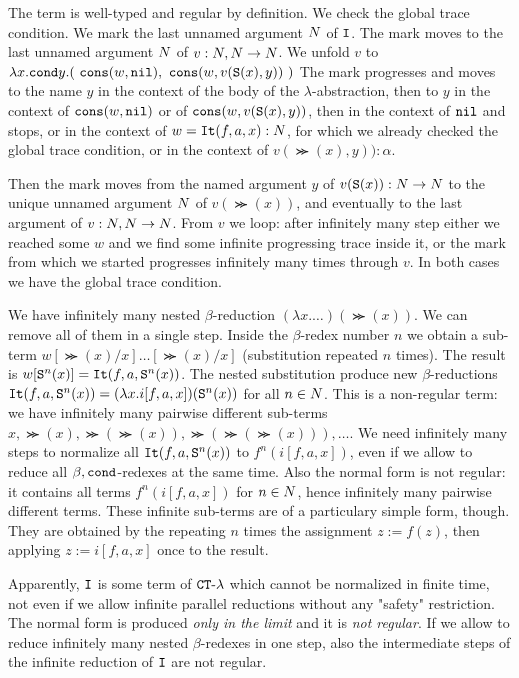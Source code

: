 \documentclass{article}
\begin{document}
The term is well-typed and regular by definition. We check the global trace condition.
We mark the last unnamed argument ${N}$ of ${\tt I}$.
The mark moves to the last unnamed argument ${N}$ of  
$v:{N},{N} \rightarrow {N}$. 
We unfold $v$ to $\lambda x.{\tt cond} y. 
(\ {\tt cons}(w, {\tt nil}),  \  {\tt cons}(w, v({\tt S} (x),y)) \ )$
The mark progresses and moves to the name $y$ in the context of the body of the $\lambda$-abstraction,
then to $y$ in the context of ${\tt cons}(w, {\tt nil})$ or of ${\tt cons}(w, v({\tt S} (x),y))$,
then in the context of ${\tt nil}$ and stops, or in the context of $w={\tt It}(f,a,x):{N}$, 
for which we already checked the global trace condition, or in the context of $v(\Succ (x),y)):\alpha$. 

Then the mark moves from the named argument $y$ of $v({\tt S} (x)):{N} \rightarrow {N}$ to the unique 
unnamed argument ${N}$ of $v(\Succ (x))$, and eventually to the last argument of $v:{N},{N}\rightarrow {N}$. 
From $v$ we loop: after infinitely many step either we reached some $w$ and we find 
some infinite progressing trace inside it, or the
mark from which we started progresses infinitely many times through $v$. In both cases we have the
global trace condition.

We have infinitely many nested $\beta$-reduction $(\lambda x. \ldots)(\Succ (x))$.
We can remove all of them in a single step. Inside the $\beta$-redex number $n$ we obtain a sub-term
$w[\Succ (x)/x]\ldots[\Succ (x)/x]$ (substitution repeated $n$ times).
The result is $w[{\tt S} ^n(x)] = {\tt It}(f,a,{\tt S} ^n(x))$.
The nested substitution produce new $\beta$-reductions 
${\tt It}(f,a,{\tt S} ^n(x)) = (\lambda x.i[f,a,x])({\tt S} ^n(x))$ for all $n \in {N}$.
This is a non-regular term: we have infinitely many pairwise different 
sub-terms $x,\Succ (x),\Succ (\Succ (x)), \Succ (\Succ (\Succ (x))), \ldots$.
We need infinitely many steps to normalize all ${\tt It}(f,a,{\tt S} ^n(x))$ to $f^n(i[f,a,x])$, 
even if we allow to reduce all $\beta,{\tt cond}$-redexes at the same time.
Also the normal form is not regular: it contains all terms $f^n(i[f,a,x])$ for $n \in {N}$, hence
infinitely many pairwise different terms. These infinite sub-terms are of a particulary simple form, though. 
They are obtained by the repeating $n$ times the assignment $z:=f(z)$, then applying $z:=i[f,a,x]$ once
to the result.

Apparently, ${\tt I}$ 
is some term of ${ {\tt CT} \mbox{-} \lambda}$ which cannot be normalized in finite time, not even if we allow
infinite parallel reductions without any "safety" restriction. The normal form is produced \emph{only in the limit}
and it is \emph{not regular}. If we allow to reduce infinitely many nested $\beta$-redexes in one step, also
the intermediate steps of the infinite reduction of ${\tt I}$ are not regular.
\end{document}
